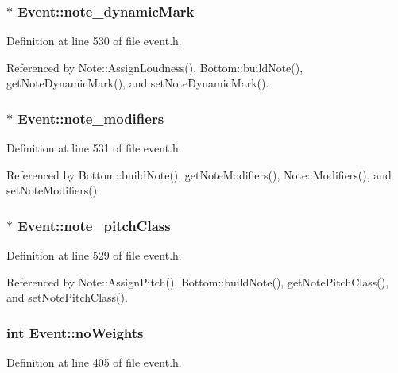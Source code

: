 \subsubsection{$\ast$ {\bf Event::note\_\-dynamic\-Mark}\hspace{0.3cm}{\tt  [protected]}}\label{classEvent_p9}




Definition at line 530 of file event.h.

Referenced by Note::Assign\-Loudness(), Bottom::build\-Note(), get\-Note\-Dynamic\-Mark(), and set\-Note\-Dynamic\-Mark().
\subsubsection{$\ast$ {\bf Event::note\_\-modifiers}\hspace{0.3cm}{\tt  [protected]}}\label{classEvent_p10}




Definition at line 531 of file event.h.

Referenced by Bottom::build\-Note(), get\-Note\-Modifiers(), Note::Modifiers(), and set\-Note\-Modifiers().
\subsubsection{$\ast$ {\bf Event::note\_\-pitch\-Class}\hspace{0.3cm}{\tt  [protected]}}\label{classEvent_p8}




Definition at line 529 of file event.h.

Referenced by Note::Assign\-Pitch(), Bottom::build\-Note(), get\-Note\-Pitch\-Class(), and set\-Note\-Pitch\-Class().
\subsubsection{\setlength{\rightskip}{0pt plus 5cm}int {\bf Event::no\-Weights}}\label{classEvent_o24}




Definition at line 405 of file event.h.

